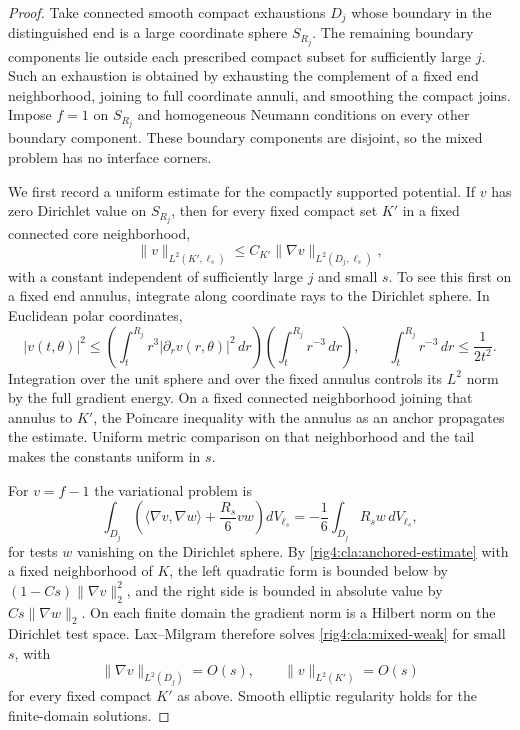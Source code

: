 \begin{proof}
Take connected smooth compact exhaustions $D_j$ whose boundary in
the distinguished end is a large coordinate sphere $S_{R_j}$.
The remaining boundary components lie outside each prescribed
compact subset for sufficiently large $j$.  Such an exhaustion is
obtained by exhausting the complement of a fixed end neighborhood,
joining to full coordinate annuli, and smoothing the compact joins.
Impose $f=1$ on $S_{R_j}$ and homogeneous Neumann conditions on every
other boundary component.  These boundary components are disjoint,
so the mixed problem has no interface corners.

We first record a uniform estimate for the compactly supported
potential.  If $v$ has zero Dirichlet value on $S_{R_j}$, then for
every fixed compact set $K'$ in a fixed connected core neighborhood,
\begin{equation}\label{rig4:cla:anchored-estimate}
 \|v\|_{L^2(K',\ell_s)}
       \le C_{K'}\|\nabla v\|_{L^2(D_j,\ell_s)},
\end{equation}
with a constant independent of sufficiently large $j$ and small $s$.
To see this first on a fixed end annulus, integrate along coordinate
rays to the Dirichlet sphere.  In Euclidean polar coordinates,
\[
 |v(t,\theta)|^2
 \le\left(\int_t^{R_j}r^3|\partial_rv(r,\theta)|^2\,dr\right)
      \left(\int_t^{R_j}r^{-3}\,dr\right),
 \qquad \int_t^{R_j}r^{-3}\,dr\le\frac1{2t^2}.
\]
Integration over the unit sphere and over the fixed annulus controls
its $L^2$ norm by the full gradient energy.  On a fixed connected
neighborhood joining that annulus to $K'$, the Poincare inequality
with the annulus as an anchor propagates the estimate.  Uniform
metric comparison on that neighborhood and the tail makes the
constants uniform in $s$.

For $v=f-1$ the variational problem is
\begin{equation}\label{rig4:cla:mixed-weak}
 \int_{D_j}\left(\langle\nabla v,\nabla w\rangle
                   +\frac{R_s}{6}vw\right)dV_{\ell_s}
       =-\frac16\int_{D_j}R_sw\,dV_{\ell_s},
\end{equation}
for tests $w$ vanishing on the Dirichlet sphere.  By
\eqref{rig4:cla:anchored-estimate} with a fixed neighborhood of $K$,
the left quadratic form is bounded below by
$(1-Cs)\|\nabla v\|_2^2$, and the right side is bounded in absolute
value by $Cs\|\nabla w\|_2$.  On each finite domain the gradient norm
is a Hilbert norm on the Dirichlet test space.  Lax--Milgram therefore
solves \eqref{rig4:cla:mixed-weak} for small $s$, with
\begin{equation}\label{rig4:cla:mixed-energy}
 \|\nabla v\|_{L^2(D_j)}=O(s),\qquad
 \|v\|_{L^2(K')}=O(s)
\end{equation}
for every fixed compact $K'$ as above.  Smooth elliptic regularity
holds for the finite-domain solutions.


\end{proof}
